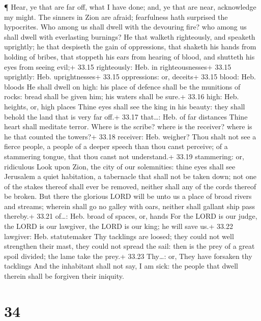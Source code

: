  ¶ Hear, ye that are far off, what I have done; and, ye
that are near, acknowledge my might.  The sinners in Zion
are afraid; fearfulness hath surprised the hypocrites. Who among us
shall dwell with the devouring fire? who among us shall dwell with
everlasting burnings?  He that walketh righteously, and
speaketh uprightly; he that despiseth the gain of oppressions, that
shaketh his hands from holding of bribes, that stoppeth his ears from
hearing of blood, and shutteth his eyes from seeing evil;+ 33.15
righteously: Heb. in righteousnesses+ 33.15 uprightly: Heb.
uprightnesses+ 33.15 oppressions: or, deceits+ 33.15 blood: Heb. bloods
 He shall dwell on high: his place of defence shall be the
munitions of rocks: bread shall be given him; his waters shall be sure.+
33.16 high: Heb. heights, or, high places  Thine eyes shall
see the king in his beauty: they shall behold the land that is very far
off.+ 33.17 that\ldots: Heb. of far distances  Thine heart
shall meditate terror. Where is the scribe? where is the receiver? where
is he that counted the towers?+ 33.18 receiver: Heb. weigher?
 Thou shalt not see a fierce people, a people of a deeper
speech than thou canst perceive; of a stammering tongue, that thou canst
not understand.+ 33.19 stammering: or, ridiculous  Look
upon Zion, the city of our solemnities: thine eyes shall see Jerusalem a
quiet habitation, a tabernacle that shall not be taken down; not one of
the stakes thereof shall ever be removed, neither shall any of the cords
thereof be broken.  But there the glorious LORD will be
unto us a place of broad rivers and streams; wherein shall go no galley
with oars, neither shall gallant ship pass thereby.+ 33.21 of\ldots:
Heb. broad of spaces, or, hands  For the LORD is our judge,
the LORD is our lawgiver, the LORD is our king; he will save us.+ 33.22
lawgiver: Heb. statutemaker  Thy tacklings are loosed; they
could not well strengthen their mast, they could not spread the sail:
then is the prey of a great spoil divided; the lame take the prey.+
33.23 Thy\ldots: or, They have forsaken thy tacklings  And
the inhabitant shall not say, I am sick: the people that dwell therein
shall be forgiven their iniquity.

\hypertarget{section-33}{%
\section{34}\label{section-33}}

